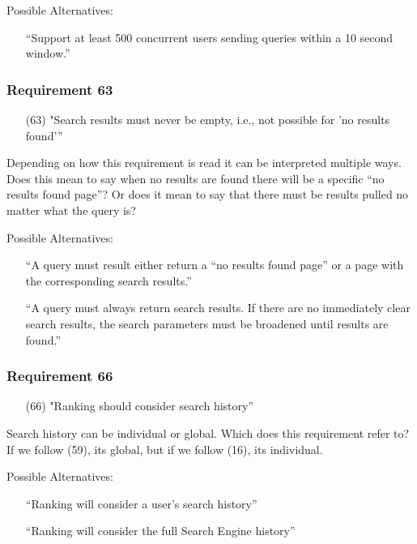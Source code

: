 \medskip

Possible Alternatives:
\begin{itemize}
  \item[] “Support at least 500 concurrent users sending queries within a 10 second window.”
\end{itemize}

\subsubsection*{Requirement 63}
\begin{itemize}
  \item[(63)] "Search results must never be empty, i.e., not possible for 'no results found'”
\end{itemize}

Depending on how this requirement is read it can be interpreted multiple ways. Does this mean to say when no results are found there will be a specific “no results found page”?
Or does it mean to say that there must be results pulled no matter what the query is?

\medskip

Possible Alternatives:
\begin{itemize}
  \item[] “A query must result either return a “no results found page” or a page with the corresponding search results.”
  \item[] “A query must always return search results. If there are no immediately clear search results, the search parameters must be broadened until results are found.”
\end{itemize}


\subsubsection*{Requirement 66}
\begin{itemize}
  \item[(66)] "Ranking should consider search history”
\end{itemize}

Search history can be individual or global. Which does this requirement refer to? If we follow (59), its global, but if we follow (16), its individual.

\medskip

Possible Alternatives:
\begin{itemize}
  \item[] “Ranking will consider a user's search history”
  \item[] “Ranking will consider the full Search Engine history”
\end{itemize}

